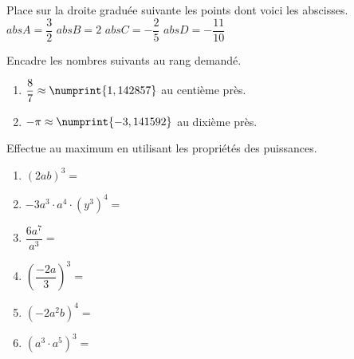 \begin{solution}

\end{solution}
\newpage
\begin{exercise}[points=2]
Place sur la droite graduée suivante les points dont voici les abscisses. \\
    \hfil
    $abs A =\dfrac{3}{2}$
    \hfil
    $abs B =2$
    \hfil
    $abs C =-\dfrac{2}{5}$
    \hfil
    $abs D =-\dfrac{11}{10}$
    \hfil
    \begin{center}
        
    \end{center}
\end{exercise}
\begin{solution}

\end{solution}
\begin{exercise}[points=2]
    Encadre les nombres suivants au rang demandé.
    \begin{enumerate}[cols=2]
        \item $\dfrac{8}{7} \approx \numprint{1,142857}$ au centième près.
        \item $-\pi \approx \numprint{-3,141592}$ au dixième près.
    \end{enumerate}
    \vspace*{2cm}
\end{exercise}
\begin{solution}

\end{solution}
\begin{exercise}[points=6]
    Effectue au maximum en utilisant les propriétés des puissances.
    \begin{enumerate}[cols=2, itemsep=3cm]
        \item $\left(2ab\right)^3=$ %
        \item $-3a^3\cdot a^4\cdot \left(y^3\right)^4=$ %
        \item $\dfrac{6a^7}{a^3}=$ %
        \item $\left( \dfrac{-2a}{3}\right)^3=$ %
        \item $\left(-2a^2b\right)^4=$ %
        \item $\left(a^3 \cdot a^5\right)^3= $ %
    \end{enumerate}
    \vspace*{3cm}
\end{exercise}
